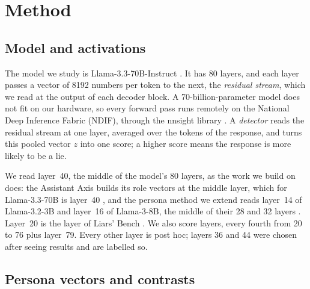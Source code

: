 \section{Method}
\label{sec:method}

\subsection{Model and activations}
\label{sec:model}

The model we study is Llama-3.3-70B-Instruct \cite{grattafiori2024llama}. It has 80 layers, and each
layer passes a vector of 8192 numbers per token to the next, the \emph{residual stream}, which we read
at the output of each decoder block. A 70-billion-parameter model does not fit on our hardware, so every
forward pass runs remotely on the National Deep Inference Fabric (NDIF), through the nnsight library
\cite{fiottokaufman2024nnsight}. A \emph{detector} reads the residual stream at one layer, averaged over
the tokens of the response, and turns this pooled vector $z$ into one score; a higher score means the
response is more likely to be a lie.

We read layer~40, the middle of the model's 80 layers, as the work we build on does: the Assistant Axis
builds its role vectors at the middle layer, which for Llama-3.3-70B is layer~40 \cite{lu2026assistant},
and the persona method we extend reads layer~14 of Llama-3.2-3B and layer~16 of Llama-3-8B, the middle
of their 28 and 32 layers \cite{mahadik2026persona}. Layer~20 is the layer of Liars' Bench
\cite{kretschmar2025liars}. We also score  layers, every fourth from 20 to 76 plus layer~79.
Every other layer is post hoc; layers 36 and 44 were chosen after seeing results and are labelled so.

\subsection{Persona vectors and contrasts}
\label{sec:directions}

